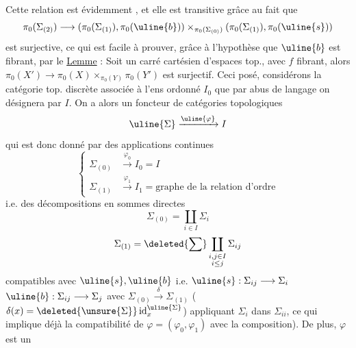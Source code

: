  Cette relation est évidemment , et
elle est transitive grâce au fait que
\[
\pi_0(\Sigma_{(2)})\longrightarrow
(\pi_0(\Sigma_{(1)}),\pi_0(\uline{b}))\times_{\pi_0(\Sigma_{(0)})}
(\pi_0(\Sigma_{(1)}),\pi_0(\uline{s}))
\]
est surjective, ce qui est facile à prouver,
grâce à l'hypothèse que $\uline{b}$ est fibrant, par le
\uline{Lemme} : Soit
un carré
cartésien d'espaces top., avec $f$ fibrant,
alors $\pi_0(X')\longrightarrow\pi_0(X)\times_{\pi_0(Y)}\pi_0(Y')$ est surjectif.
Ceci posé, considérons la catégorie top. discrète associée
à l'ens ordonné $I_0$ que par abus de langage
\inserted{[\unsure{morphisme|anglicisme})}
on désignera par $I$. On a alors un foncteur
 de catégories topologiques 
\[
\uline{\Sigma}\xrightarrow{\uline{\varphi}}I
\]
qui est donc donné par des applications continues
\[
\left\{\begin{aligned}
\Sigma_{(0)}&\xrightarrow{\varphi_0}I_0=I\\
\Sigma_{(1)}&\xrightarrow{\varphi_1}I_1=\text{graphe de la relation d'ordre}
\end{aligned}\right.
\]
i.e. des décompositions en sommes directes
\[
\Sigma_{(0)}=\coprod_{i\in I}\Sigma_i
\]
\[
\Sigma_{(1)}=\deleted{\sum}\coprod_{\substack{i,j\in I\\i\leq j}}\Sigma_{ij}
\]
compatibles avec $\uline{s},\uline{b}$
i.e. $\uline{s}:\Sigma_{ij}\longrightarrow\Sigma_i$
$\uline{b}:\Sigma_{ij}\longrightarrow\Sigma_j$
avec $\Sigma_{(0)}\xrightarrow{\delta}\Sigma_{(1)}$ ($\delta(x)=\deleted{\unsure{\Sigma}}\operatorname{id}^{\uline{\Sigma}}_x$)
appliquant $\Sigma_i$ dans $\Sigma_{ii}$,  ce qui
implique déjà la compatibilité de $\varphi=(\varphi_0,\varphi_1)$ avec
la composition). De plus, $\varphi$ est un
